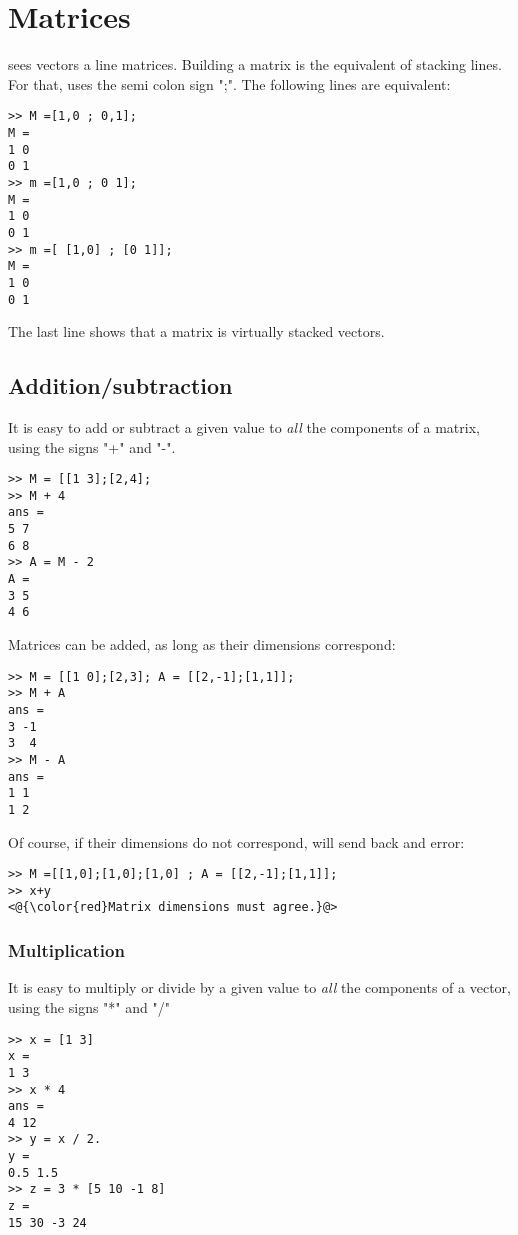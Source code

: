 
\section{Matrices}
\matlab sees vectors a line matrices. Building a matrix is the equivalent of stacking lines.
For that, \matlab uses the semi colon sign ";".
The following lines are equivalent:
\begin{lstlisting}
>> M =[1,0 ; 0,1];
M = 
1 0
0 1
>> m =[1,0 ; 0 1];
M = 
1 0
0 1
>> m =[ [1,0] ; [0 1]];
M = 
1 0
0 1
\end{lstlisting}

The last line shows that a matrix is virtually stacked vectors.


\subsection{Addition/subtraction}
It is easy to add or subtract a given value to \emph{all} the components of a matrix, using the signs "+" and "-".

\begin{lstlisting}
>> M = [[1 3];[2,4];
>> M + 4
ans =
5 7
6 8
>> A = M - 2
A =
3 5
4 6
\end{lstlisting}


Matrices can be added, as long as their dimensions correspond:

\begin{lstlisting}
>> M = [[1 0];[2,3]; A = [[2,-1];[1,1]];
>> M + A
ans =
3 -1
3  4
>> M - A
ans =
1 1
1 2
\end{lstlisting}

Of course, if their dimensions do not correspond, \matlab will send back and error:

\begin{lstlisting}
>> M =[[1,0];[1,0];[1,0] ; A = [[2,-1];[1,1]];
>> x+y
<@{\color{red}Matrix dimensions must agree.}@>
\end{lstlisting}



\subsubsection{Multiplication}
It is easy to multiply or divide by a given value to \emph{all} the components of a vector, using the signs "*" and "/"

\begin{lstlisting}
>> x = [1 3]
x = 
1 3
>> x * 4
ans =
4 12
>> y = x / 2.
y =
0.5 1.5
>> z = 3 * [5 10 -1 8]
z = 
15 30 -3 24
\end{lstlisting}

